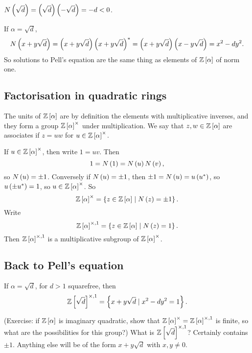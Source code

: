 \begin{example*}
$ N\left( \sqrt{d} \right) = \left( \sqrt{d} \right)\left( -\sqrt{d} \right) = -d < 0 $.
\end{example*}

\begin{example*}
If $ \alpha = \sqrt{d} $,
$$ N\left( x + y\sqrt{d} \right) = \left( x + y\sqrt{d} \right)\left( x + y\sqrt{d} \right)^* = \left( x + y\sqrt{d} \right)\left( x - y\sqrt{d} \right) = x^2 - dy^2. $$
So solutions to Pell's equation are the same thing as elements of $ \mathbb{Z}\left[ \alpha \right] $ of norm one.
\end{example*}

\subsection{Factorisation in quadratic rings}

\begin{definition}
The units of $ \mathbb{Z}\left[ \alpha \right] $ are by definition the elements with multiplicative inverses, and they form a group $ \mathbb{Z}\left[ \alpha \right]^\times $ under multiplication. We say that $ z, w \in \mathbb{Z}\left[ \alpha \right] $ are associates if $ z = uw $ for $ u \in \mathbb{Z}\left[ \alpha \right]^\times $.
\end{definition}

If $ u \in \mathbb{Z}\left[ \alpha \right]^\times $, then write $ 1 = uv $. Then
$$ 1 = N\left( 1 \right) = N\left( u \right)N\left( v \right), $$
so $ N\left( u \right) = \pm 1 $. Conversely if $ N\left( u \right) = \pm 1 $, then $ \pm 1 = N\left( u \right) = u\left( u^* \right) $, so $ u\left( \pm u^* \right) = 1 $, so $ u \in \mathbb{Z}\left[ \alpha \right]^\times $. So
$$ \mathbb{Z}\left[ \alpha \right]^\times = \left\{ z \in \mathbb{Z}\left[ \alpha \right] \mid N\left( z \right) = \pm 1 \right\}. $$
Write
$$ \mathbb{Z}\left[ \alpha \right]^{\times, 1} = \left\{ z \in \mathbb{Z}\left[ \alpha \right] \mid N\left( z \right) = 1 \right\}. $$
Then $ \mathbb{Z}\left[ \alpha \right]^{\times, 1} $ is a multiplicative subgroup of $ \mathbb{Z}\left[ \alpha \right]^\times $.

\subsection{Back to Pell's equation}

\begin{example*}
If $ \alpha = \sqrt{d} $, for $ d > 1 $ squarefree, then
$$ \mathbb{Z}\left[ \sqrt{d} \right]^{\times, 1} = \left\{ x + y\sqrt{d} \mid x^2 - dy^2 = 1 \right\}. $$
\end{example*}

(Exercise: if $ \mathbb{Z}\left[ \alpha \right] $ is imaginary quadratic, show that $ \mathbb{Z}\left[ \alpha \right]^\times = \mathbb{Z}\left[ \alpha \right]^{\times, 1} $ is finite, so what are the possibilities for this group?) What is $ \mathbb{Z}\left[ \sqrt{d} \right]^{\times, 1} $? Certainly contains $ \pm 1 $. Anything else will be of the form $ x + y\sqrt{d} $ with $ x, y \ne 0 $.

